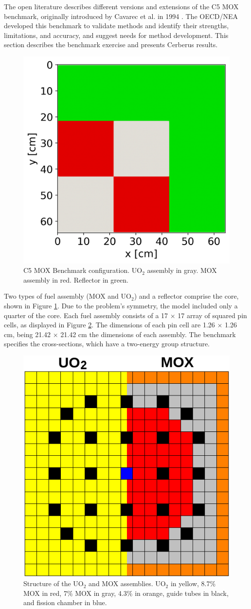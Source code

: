 \documentclass{anstrans}
\begin{document}
The open literature describes different versions and extensions of the C5 MOX benchmark, originally introduced by Cavarec et al. in 1994 \cite{cavarec_benchmark_1994}.
The \gls{OECD}/\gls{NEA} developed this benchmark to validate methods and identify their strengths, limitations, and accuracy, and suggest needs for method development.
This section describes the benchmark exercise and presents Cerberus results.

\begin{figure}[H] %
    \centering
    \includegraphics[width=0.55\linewidth]{figures/geo-xy2.png}
    \hfill
    \caption{C5 MOX Benchmark configuration. UO$_2$ assembly in gray. MOX assembly in red. Reflector in green.}
    \label{fig:bench1}
\end{figure}

Two types of fuel assembly (MOX and UO$_2$) and a reflector comprise the core, shown in Figure \ref{fig:bench1}.
Due to the problem's symmetry, the model included only a quarter of the core.
Each fuel assembly consists of a 17 $\times$ 17 array of squared pin cells, as displayed in Figure \ref{fig:bench2}.
The dimensions of each pin cell are 1.26 $\times$ 1.26 cm, being 21.42 $\times$ 21.42 cm the dimensions of each assembly.
The benchmark \cite{cavarec_benchmark_1994} specifies the cross-sections, which have a two-energy group structure.


\begin{figure}[htbp!] %
    \centering
    \includegraphics[width=0.45\linewidth]{figures/bench-config2.png}
    \hfill
    \caption{Structure of the UO$_2$ and MOX assemblies. UO$_2$ in yellow, 8.7\% MOX in red, 7\% MOX in gray, 4.3\% in orange, guide tubes in black, and fission chamber in blue.}
    \label{fig:bench2}
\end{figure}
\end{document}
